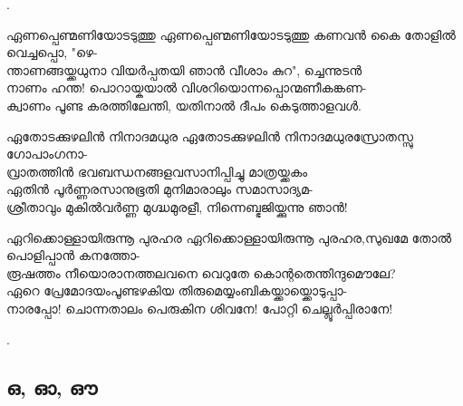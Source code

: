 \begin{enumerate}

.


\begin{slokam}{\VSv}{\VNM}{ഏണപ്പെണ്മണിയോടടുത്തു}
ഏണപ്പെണ്മണിയോടടുത്തു കണവൻ കൈ തോളിൽ വെച്ചപ്പൊ, "ഴെ- \\
ന്താണങ്ങയ്ക്കധുനാ വിയർപ്പതയി ഞാൻ വീശാം കുറ", ച്ചെന്നുടൻ \\ 
നാണം ഹന്ത! പൊറായ്കയാൽ വിശറിയൊന്നപ്പൊന്മണീകങ്കണ-\\ 
ക്വാണം പൂണ്ട കരത്തിലേന്തി, യതിനാൽ ദീപം കെടുത്താളവൾ. 
\end{slokam}



\begin{slokam}{\VSv}{\VKG}{ഏതോടക്കുഴലിൻ നിനാദമധുര}
 ഏതോടക്കുഴലിൻ നിനാദമധുരസ്രോതസ്സു ഗോപാംഗനാ-\\
വ്രാതത്തിന്‍ ഭവബന്ധനങ്ങളവസാനിപ്പിച്ചു മാത്രയ്ക്കകം\\
ഏതിന്‍ പൂര്‍ണ്ണരസാനുഭൂതി മുനിമാരാലും സമാസാദ്യമ-\\
ശ്രീതാവും മുകില്‍വര്‍ണ്ണ മുഗ്ദ്ധമുരളീ, നിന്നെബ്ഭജിയ്ക്കുന്നു ഞാന്‍!
\end{slokam}




\begin{slokam}{\VSr}{\Unk}{ഏറിക്കൊള്ളായിരുന്നൂ പുരഹര}
ഏറിക്കൊള്ളായിരുന്നൂ പുരഹര,സുഖമേ തോല്‍ പൊളിപ്പാന്‍ കനത്തോ-\\
രൂഷത്തം നീയൊരാനത്തലവനെ വെറുതേ കൊന്റതെന്തിന്ദുമൌലേ?\\
ഏറെ പ്രേമോദയംപൂണ്ടഴകിയ തിരുമെയ്യംബികയ്ക്കായ്ക്കൊടുപ്പാ-\\
നാരപ്പോ! ചൊന്നതാലം പെരുകിന ശിവനേ! പോറ്റി ചെല്ലൂര്‍പ്പിരാനേ!
\end{slokam}


. 

\end{enumerate}

\subsection{ഒ, ഓ, ഔ}


